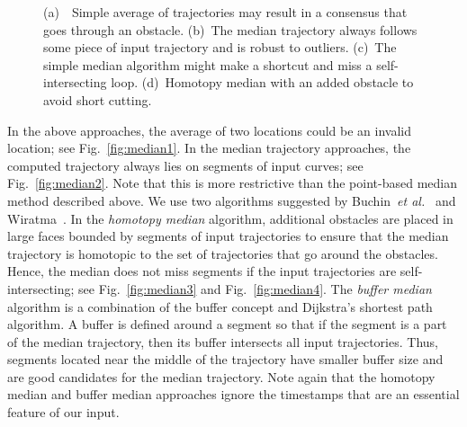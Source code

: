 \documentclass{llncs}
\begin{document}
\begin{figure}[t]
\center
\caption{\small (a)~~Simple average of trajectories may result in a consensus
 that goes through an obstacle.
(b)~The median trajectory always follows some piece of input
trajectory and is robust to outliers.
(c)~The simple median algorithm might make a shortcut and miss a self-
intersecting loop.
(d)~Homotopy median with an added obstacle to avoid short cutting.}
\end{figure}



\medskip{}
In the above approaches, the average of two locations could be an
invalid location; see Fig.~\ref{fig:median1}.
In the median trajectory approaches, the computed trajectory always
lies on segments of input curves; see Fig.~\ref{fig:median2}. Note that
this is more restrictive than the point-based median method described above.
We use two algorithms suggested by Buchin~{\em et al.}~\cite{bbklsww-mt-10} and
Wiratma~\cite{wiratma10}.
In the \emph{homotopy median} algorithm, additional obstacles are placed in
large faces bounded by segments
of input trajectories to ensure that the median
trajectory is homotopic to the set of trajectories that go around
the obstacles. Hence, the median does not miss segments if the input
trajectories are self-intersecting; see Fig.~\ref{fig:median3} and
Fig.~\ref{fig:median4}.
The \emph{buffer median} algorithm is a combination of the buffer
concept and Dijkstra's shortest path algorithm. A buffer is defined around a
segment so that if the segment is a part of the
median trajectory, then its buffer intersects all input trajectories. Thus,
segments located near the middle of the trajectory have smaller
buffer size and are good candidates for the median
trajectory.
Note again that the homotopy median and buffer median approaches ignore the
timestamps that are an essential feature of our input.
\end{document}
